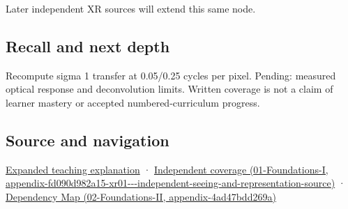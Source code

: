 Later independent XR sources will extend this same node.

\subsection{Recall and next depth}\label{appendix-8b76b0efd27f-recall-and-next-depth}

Recompute sigma 1 transfer at 0.05/0.25 cycles per pixel. Pending: measured optical response and deconvolution limits. Written coverage is not a claim of learner mastery or accepted numbered-curriculum progress.

\subsection{Source and navigation}\label{appendix-8b76b0efd27f-source-and-navigation}

\href{Continuous\%20Notes/University\%20-\%20Worlds,\%20Images\%20and\%20Inference\%20-\%20Graphics,\%20Vision\%20and\%20Photography\#A\%20footprint\%20is\%20more\%20meaningful\%20than\%20an\%20isolated\%20pixel\%20center}{Expanded teaching explanation} · \href{../01-Foundations-I/main.pdf\#nameddest=appendix-fd090d982a15-xr01---independent-seeing-and-representation-source}{Independent coverage (01-Foundations-I, appendix-fd090d982a15-xr01-\/-\/-independent-seeing-and-representation-source)} · \href{../02-Foundations-II/main.pdf\#nameddest=appendix-4ad47bdd269a}{Dependency Map (02-Foundations-II, appendix-4ad47bdd269a)}
